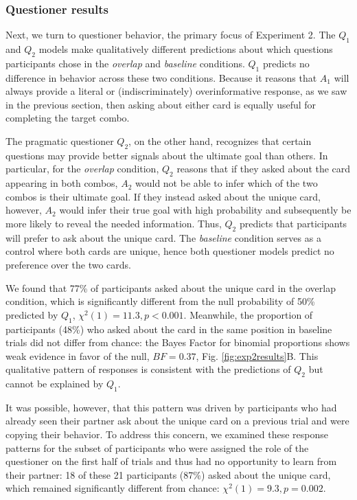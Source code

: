 \documentclass[11pt, floatsintext]{apa6}
\begin{document}
\subsubsection{Questioner results}

Next, we turn to questioner behavior, the primary focus of Experiment 2.
The $Q_1$ and $Q_2$ models make qualitatively different predictions about which questions participants chose in the \emph{overlap} and \emph{baseline} conditions.
$Q_1$ predicts no difference in behavior across these two conditions.
Because it reasons that $A_1$ will always provide a literal or (indiscriminately) overinformative response, as we saw in the previous section, then asking about either card is equally useful for completing the target combo.

The pragmatic questioner $Q_2$, on the other hand, recognizes that certain questions may provide better signals about the ultimate goal than others.
In particular, for the \emph{overlap} condition, $Q_2$ reasons that if they asked about the card appearing in both combos, $A_2$ would not be able to infer which of the two combos is their ultimate goal.
If they instead asked about the unique card, however, $A_2$ would infer their true goal with high probability and subsequently be more likely to reveal the needed information.
Thus, $Q_2$ predicts that participants will prefer to ask about the unique card.
The \emph{baseline} condition serves as a control where both cards are unique, hence both questioner models predict no preference over the two cards.

We found that 77\% of participants asked about the unique card in the overlap condition, which is significantly different from the null probability of 50\% predicted by $Q_1$, $\chi^2(1) = 11.3, p < 0.001$. 
Meanwhile, the proportion of participants (48\%) who asked about the card in the same position in baseline trials did not differ from chance: the Bayes Factor for binomial proportions  \cite{morey2016philosophy, morey2015package} shows weak evidence in favor of the null, $BF = 0.37$, Fig. \ref{fig:exp2results}B. 
This qualitative pattern of responses is consistent with the predictions of $Q_2$ but cannot be explained by $Q_1$.

It was possible, however, that this pattern was driven by participants who had already seen their partner ask about the unique card on a previous trial and were copying their behavior. 
To address this concern, we examined these response patterns for the subset of participants who were assigned the role of the questioner on the first half of trials and thus had no opportunity to learn from their partner: 18 of these 21 participants (87\%) asked about the unique card, which remained significantly different from chance: $\chi^2(1) = 9.3, p = 0.002$.
\end{document}
